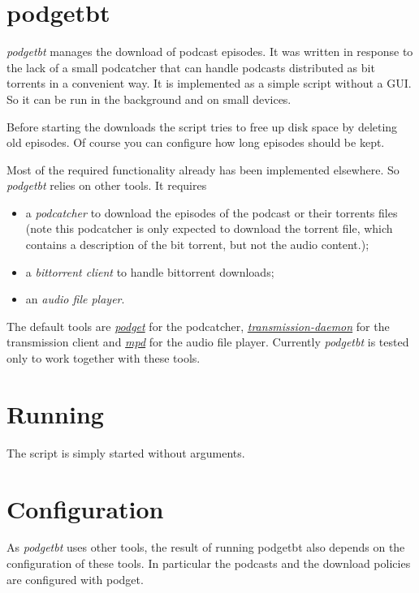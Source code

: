 \section*{podgetbt}\label{podgetbt}
\newcommand{\podgetbt}{\emph{podgetbt}}
\podgetbt{} manages the download of podcast episodes.
It was written in response to the lack of a small podcatcher 
that can handle podcasts distributed as bit torrents
in a convenient way. 
It is implemented as a simple script without a GUI.
So it can be run in the background and on small devices.

Before starting the downloads the script tries to free
up disk space by deleting old episodes. Of course you 
can configure how long episodes should be kept.

Most of the required functionality already has been 
implemented elsewhere.
So \podgetbt{} relies on other tools. It requires 
\begin{itemize}
\item a \emph{podcatcher} to download the episodes
  of the podcast or their torrents files (note this podcatcher is 
  only expected to download the torrent file, which contains 
  a description of the bit torrent, but not the audio content.);
\item a \emph{bittorrent client} to handle bittorrent downloads;
\item an \emph{audio file player}. 
\end{itemize}

The default tools are 
\href{http://podget.sourceforge.net}{\emph{podget}} for the podcatcher, 
\href{http://www.transmissionbt.com}{\emph{transmission-daemon}} for the transmission client and 
\href{http://www.musicpd.org}{\emph{mpd}} for the audio file player.
Currently \podgetbt{} is tested only to work together with these tools. 

\section*{Running}\label{running}

The script is simply started without arguments.

\section*{Configuration}\label{configuration}

As \emph{podgetbt} uses other tools, the result of running podgetbt
also depends on the configuration of these tools. In particular the podcasts
and the download policies are configured with podget.


